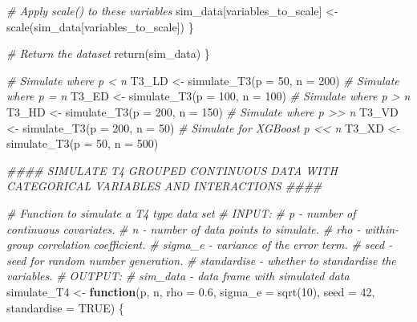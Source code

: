 \documentclass[
  11pt,
]{article}
\newenvironment{Shaded}{}{}
\newcommand{\AttributeTok}[1]{\textcolor[rgb]{0.49,0.56,0.16}{#1}}
\newcommand{\CommentTok}[1]{\textcolor[rgb]{0.38,0.63,0.69}{\textit{#1}}}
\newcommand{\ConstantTok}[1]{\textcolor[rgb]{0.53,0.00,0.00}{#1}}
\newcommand{\ControlFlowTok}[1]{\textcolor[rgb]{0.00,0.44,0.13}{\textbf{#1}}}
\newcommand{\DecValTok}[1]{\textcolor[rgb]{0.25,0.63,0.44}{#1}}
\newcommand{\DocumentationTok}[1]{\textcolor[rgb]{0.73,0.13,0.13}{\textit{#1}}}
\newcommand{\FloatTok}[1]{\textcolor[rgb]{0.25,0.63,0.44}{#1}}
\newcommand{\FunctionTok}[1]{\textcolor[rgb]{0.02,0.16,0.49}{#1}}
\newcommand{\NormalTok}[1]{#1}
\newcommand{\OtherTok}[1]{\textcolor[rgb]{0.00,0.44,0.13}{#1}}
\begin{document}
\begin{Shaded}
\begin{Highlighting}[]
    \CommentTok{\# Apply scale() to these variables}
\NormalTok{    sim\_data[variables\_to\_scale] }\OtherTok{\textless{}{-}} \FunctionTok{scale}\NormalTok{(sim\_data[variables\_to\_scale])}
\NormalTok{  \}}
  
  \CommentTok{\# Return the dataset}
  \FunctionTok{return}\NormalTok{(sim\_data)}
\NormalTok{\}}

\CommentTok{\# Simulate where p \textless{} n}
\NormalTok{T3\_LD }\OtherTok{\textless{}{-}} \FunctionTok{simulate\_T3}\NormalTok{(}\AttributeTok{p =} \DecValTok{50}\NormalTok{, }\AttributeTok{n =} \DecValTok{200}\NormalTok{)}
\CommentTok{\# Simulate where p = n}
\NormalTok{T3\_ED }\OtherTok{\textless{}{-}} \FunctionTok{simulate\_T3}\NormalTok{(}\AttributeTok{p =} \DecValTok{100}\NormalTok{, }\AttributeTok{n =} \DecValTok{100}\NormalTok{)}
\CommentTok{\# Simulate where p \textgreater{} n}
\NormalTok{T3\_HD }\OtherTok{\textless{}{-}} \FunctionTok{simulate\_T3}\NormalTok{(}\AttributeTok{p =} \DecValTok{200}\NormalTok{, }\AttributeTok{n =} \DecValTok{150}\NormalTok{)}
\CommentTok{\# Simulate where p \textgreater{}\textgreater{} n}
\NormalTok{T3\_VD }\OtherTok{\textless{}{-}} \FunctionTok{simulate\_T3}\NormalTok{(}\AttributeTok{p =} \DecValTok{200}\NormalTok{, }\AttributeTok{n =} \DecValTok{50}\NormalTok{)}
\CommentTok{\# Simulate for XGBoost p \textless{}\textless{} n}
\NormalTok{T3\_XD }\OtherTok{\textless{}{-}} \FunctionTok{simulate\_T3}\NormalTok{(}\AttributeTok{p =} \DecValTok{50}\NormalTok{, }\AttributeTok{n =} \DecValTok{500}\NormalTok{)}

\DocumentationTok{\#\#\#\# SIMULATE T4 GROUPED CONTINUOUS DATA WITH CATEGORICAL VARIABLES AND INTERACTIONS \#\#\#\#}

\CommentTok{\# Function to simulate a T4 type data set}
\CommentTok{\# INPUT: }
\CommentTok{\#       p {-} number of continuous covariates.}
\CommentTok{\#       n {-} number of data points to simulate.}
\CommentTok{\#       rho {-} within{-}group correlation coefficient.}
\CommentTok{\#       sigma\_e {-} variance of the error term.}
\CommentTok{\#       seed {-} seed for random number generation.}
\CommentTok{\#       standardise {-} whether to standardise the variables.}
\CommentTok{\# OUTPUT:}
\CommentTok{\#       sim\_data {-} data frame with simulated data}
\NormalTok{simulate\_T4 }\OtherTok{\textless{}{-}} \ControlFlowTok{function}\NormalTok{(p, n, }\AttributeTok{rho =} \FloatTok{0.6}\NormalTok{, }\AttributeTok{sigma\_e =} \FunctionTok{sqrt}\NormalTok{(}\DecValTok{10}\NormalTok{), }
                        \AttributeTok{seed =} \DecValTok{42}\NormalTok{, }\AttributeTok{standardise =} \ConstantTok{TRUE}\NormalTok{) \{}
  

\end{Highlighting}
\end{Shaded}
\end{document}
